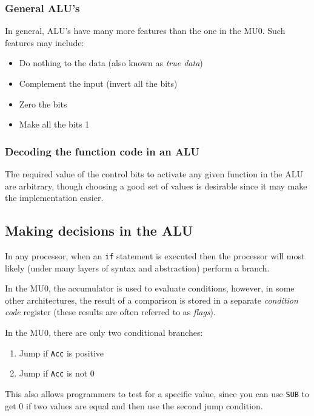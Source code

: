 \subsubsection{General ALU's}

In general, ALU's have many more features than the one in the MU0. Such features
may include:

\begin{itemize}
	\item Do nothing to the data (also known as {\it true data})
	\item Complement the input (invert all the bits)
	\item Zero the bits
	\item Make all the bits 1
\end{itemize}

\subsubsection{Decoding the function code in an ALU}

The required value of the control bits to activate any given function in the ALU
are arbitrary, though choosing a good set of values is desirable since it may
make the implementation easier.

\subsection{Making decisions in the ALU}

In any processor, when an {\tt if} statement is executed then the processor will
most likely (under many layers of syntax and abstraction) perform a branch.

In the MU0, the accumulator is used to evaluate conditions, however, in some
other architectures, the result of a comparison is stored in a separate {\it
condition code} register (these results are often referred to as {\it flags}).

In the MU0, there are only two conditional branches:

\begin{enumerate}
	\item Jump if {\tt Acc} is positive
	\item Jump if {\tt Acc} is not 0
\end{enumerate}

This also allows programmers to test for a specific value, since you can use
{\tt SUB} to get 0 if two values are equal and then use the second jump
condition.

